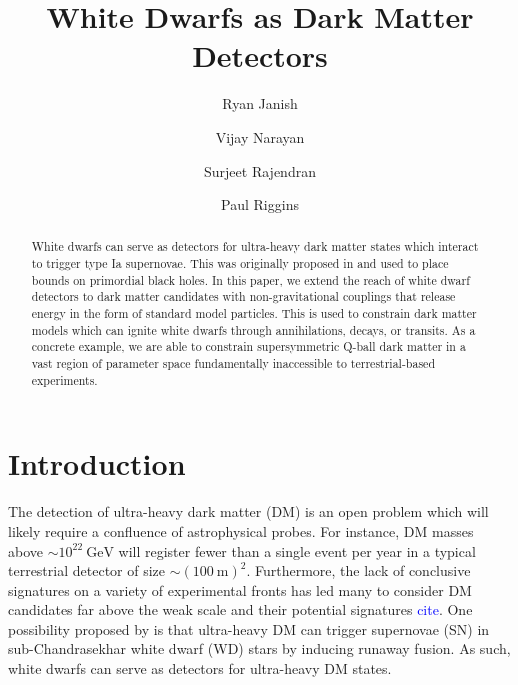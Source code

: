 \documentclass[twocolumn,showpacs,preprintnumbers,amsmath,amssymb,prd]{revtex4}
\newcommand{\GeV}{\text{GeV}}
\begin{document}
\title{White Dwarfs as Dark Matter Detectors}

\author{Ryan Janish}

\author{Vijay Narayan}

\author{Surjeet Rajendran}

\author{Paul Riggins}

\begin{abstract}

White dwarfs can serve as detectors for ultra-heavy dark matter states which interact to trigger type Ia supernovae.
This was originally proposed in \cite{Graham:2015apa} and used to place bounds on primordial black holes.
In this paper, we extend the reach of white dwarf detectors to dark matter candidates with non-gravitational couplings that release energy in the form of standard model particles.
This is used to constrain dark matter models which can ignite white dwarfs through annihilations, decays, or transits.
As a concrete example, we are able to constrain supersymmetric Q-ball dark matter in a vast region of parameter space fundamentally inaccessible to terrestrial-based experiments.


\end{abstract}
\maketitle
\tableofcontents
\newpage

\section{Introduction}
\label{sec:Introduction}

The detection of ultra-heavy dark matter (DM) is an open problem which will likely require a confluence of astrophysical probes.
For instance, DM masses above $\sim 10^{22} ~\GeV$ will register fewer than a single event per year in a typical terrestrial detector of size $\sim (100 ~\text{m})^2$.
Furthermore, the lack of conclusive signatures on a variety of experimental fronts has led many to consider DM candidates far above the weak scale and their potential signatures \textcolor{blue}{cite}.
One possibility proposed by \cite{Graham:2015apa} is that ultra-heavy DM can trigger supernovae (SN) in sub-Chandrasekhar white dwarf (WD) stars by inducing runaway fusion.
As such, white dwarfs can serve as detectors for ultra-heavy DM states.
\end{document}
